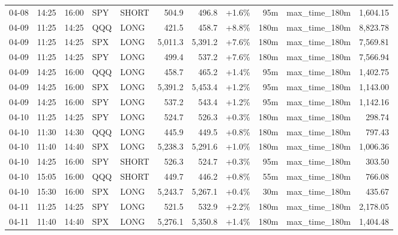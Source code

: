 \documentclass[11pt,a4paper,twoside]{article}
\begin{document}
\begin{center}
\begin{longtable}{>{\color{txtmain}}l l l l l r r r r >{\color{txtmain}}l r}
04-08 & 14:25 & 16:00 & SPY & SHORT & 504.9 & 496.8 & \textcolor{wingreen}{+1.6\%} & 95m & max\_time\_180m & \textcolor{wingreen}{1,604.15} \\
04-09 & 11:25 & 14:25 & QQQ & LONG & 421.5 & 458.7 & \textcolor{wingreen}{+8.8\%} & 180m & max\_time\_180m & \textcolor{wingreen}{8,823.78} \\
04-09 & 11:25 & 14:25 & SPX & LONG & 5,011.3 & 5,391.2 & \textcolor{wingreen}{+7.6\%} & 180m & max\_time\_180m & \textcolor{wingreen}{7,569.81} \\
04-09 & 11:25 & 14:25 & SPY & LONG & 499.4 & 537.2 & \textcolor{wingreen}{+7.6\%} & 180m & max\_time\_180m & \textcolor{wingreen}{7,566.94} \\
04-09 & 14:25 & 16:00 & QQQ & LONG & 458.7 & 465.2 & \textcolor{wingreen}{+1.4\%} & 95m & max\_time\_180m & \textcolor{wingreen}{1,402.75} \\
04-09 & 14:25 & 16:00 & SPX & LONG & 5,391.2 & 5,453.4 & \textcolor{wingreen}{+1.2\%} & 95m & max\_time\_180m & \textcolor{wingreen}{1,143.00} \\
04-09 & 14:25 & 16:00 & SPY & LONG & 537.2 & 543.4 & \textcolor{wingreen}{+1.2\%} & 95m & max\_time\_180m & \textcolor{wingreen}{1,142.16} \\
04-10 & 11:25 & 14:25 & SPY & LONG & 524.7 & 526.3 & \textcolor{wingreen}{+0.3\%} & 180m & max\_time\_180m & \textcolor{wingreen}{298.74} \\
04-10 & 11:30 & 14:30 & QQQ & LONG & 445.9 & 449.5 & \textcolor{wingreen}{+0.8\%} & 180m & max\_time\_180m & \textcolor{wingreen}{797.43} \\
04-10 & 11:40 & 14:40 & SPX & LONG & 5,238.3 & 5,291.6 & \textcolor{wingreen}{+1.0\%} & 180m & max\_time\_180m & \textcolor{wingreen}{1,006.36} \\
04-10 & 14:25 & 16:00 & SPY & SHORT & 526.3 & 524.7 & \textcolor{wingreen}{+0.3\%} & 95m & max\_time\_180m & \textcolor{wingreen}{303.50} \\
04-10 & 15:05 & 16:00 & QQQ & SHORT & 449.7 & 446.2 & \textcolor{wingreen}{+0.8\%} & 55m & max\_time\_180m & \textcolor{wingreen}{766.08} \\
04-10 & 15:30 & 16:00 & SPX & LONG & 5,243.7 & 5,267.1 & \textcolor{wingreen}{+0.4\%} & 30m & max\_time\_180m & \textcolor{wingreen}{435.67} \\
04-11 & 11:25 & 14:25 & SPY & LONG & 521.5 & 532.9 & \textcolor{wingreen}{+2.2\%} & 180m & max\_time\_180m & \textcolor{wingreen}{2,178.05} \\
04-11 & 11:40 & 14:40 & SPX & LONG & 5,276.1 & 5,350.8 & \textcolor{wingreen}{+1.4\%} & 180m & max\_time\_180m & \textcolor{wingreen}{1,404.48} \\

\end{longtable}
\end{center}
\end{document}
